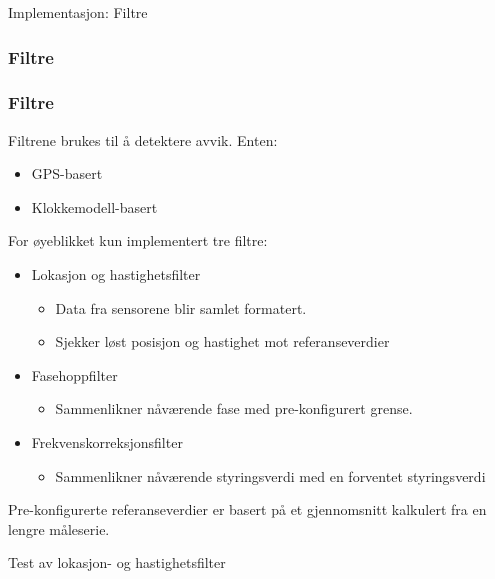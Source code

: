 \documentclass[xcolor=table]{beamer}
\begin{document}
\begin{frame}
\centering
Implementasjon: Filtre
\end{frame}

\subsubsection{Filtre}
\begin{frame}
  \frametitle{Filtre}
  Filtrene brukes til å detektere avvik. Enten:
        \begin{itemize}
          \item GPS-basert
          \item Klokkemodell-basert
        \end{itemize}
  For øyeblikket kun implementert tre filtre:
  \begin{itemize}
    \item Lokasjon og hastighetsfilter
                  \begin{itemize}
                    \item Data fra sensorene blir samlet formatert.
                    \item Sjekker løst posisjon og hastighet mot referanseverdier
                  \end{itemize}
    \item Fasehoppfilter
                    \begin{itemize}
                      \item Sammenlikner nåværende fase med pre-konfigurert grense.
                    \end{itemize}
    \item Frekvenskorreksjonsfilter
                    \begin{itemize}
                      \item Sammenlikner nåværende styringsverdi med en forventet styringsverdi
                    \end{itemize}
  \end{itemize}
  Pre-konfigurerte referanseverdier er basert på et gjennomsnitt kalkulert fra en lengre måleserie.
\end{frame}

\begin{frame}
\centering
Test av lokasjon- og hastighetsfilter
\end{frame}
\end{document}
